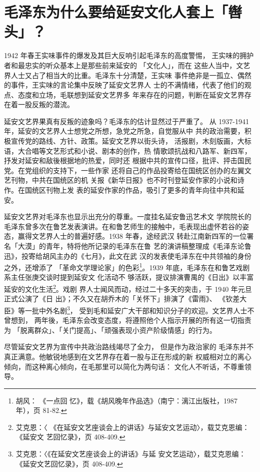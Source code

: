 \section{毛泽东为什么要给延安文化人套上「辔头」？}
1942 年春王实味事件的爆发及其巨大反响引起毛泽东的高度警惕，
王实味的拥护者和最忠实的听众基本上是那些前来延安的
「文化人」，而在
这些人当中，文艺界人士又占了相当大的比重。毛泽东十分清楚，王实味
事件绝非是一孤立、偶然的事件，王实味的言论集中反映了延安文艺界人
士的不满情绪，代表了他们的观点、态度和立场，毛联想到延安文艺界多
年来存在的问题，判断在延安文艺界存在着一股反叛的潜流。

延安文艺界果真有反叛的迹象吗？毛泽东的估计显然过于严重了。
从
1937-1941 年，延安的文艺界人士想党之所想，急党之所急，自觉服从中
共的政治需要，积极宣传党的路线、方针、政策。延安文艺界以街头诗，
活报剧，木刻版画，大标语，大合唱等文艺形式和小说、剧本的创作，热
情歌颂抗战和八路军、新四军，抒发对延安和敌後根据地的热爱，同时还
根据中共的宣传口径，批评、抨击国民党。在党组织的支持下，一些作家
还将自己的作品投寄给在国统区创办的左翼文艺刊物，中共在国统区的机
关报《新华日报》也不时刊登延安作家的小说和诗作。在国统区刊物上发
表的延安作家的作品，吸引了更多的青年向往中共和延安。

延安文艺界对毛泽东也显示出充分的尊重。一度挂名延安鲁迅艺术文 学院院长的
毛泽东曾多次在鲁艺发表演讲。在和鲁艺师生的接触中，毛表现出虚怀若谷的姿
态，赢得文艺界人士的普遍好感。1938 年春，途经武汉 转赴江南新四军的一位署
名「大漠」的青年，特将他所记录的毛泽东在鲁 艺的演讲稿整理成《毛泽东论鲁
迅》，投寄给胡风主办的《七月》，此文在武
汉的发表使毛泽东在中共领袖的身份之外，还增添了 「革命文学理论家」的色彩\footnote{胡风： 《一点回
忆》，载《胡风晚年作品选》（南宁：漓江出版社，1987 年），页
81-82.}。1939 年底，毛泽东在和鲁艺戏剧系主任张庚交谈时提到延安文 化活动不
够活跃，提议排演曹禺的《日出》以丰富延安的文化生活\footnote{艾克恩：〈
《在延安文艺座谈会上的讲话》与延安文艺运动〉，载艾克恩编： 《延安文
艺回忆录》，页 408-409.}。戏剧 界人士闻风而动，经过二十多天的突击，于
1940 年元旦正式公演了《日 出》；不久又在胡乔木的「关怀下」排演了《雷雨》、
《钦差大臣》等一批中外名剧\footnote{艾克恩：〈《在延安文艺座谈会上的讲话》与延
安文艺运动〉，载艾克恩编： 《延安文艺回忆录》，页 408-409.}，
受到毛和延安广大干部和知识分子的欢迎。文艺界人士不曾想到，
两年後，毛泽东会改变态度，将遵照他个人指示开展的所有这一切指责为
「脱离群众」、「关门提高」、「顽强表现小资产阶级情感」的行为。

尽管延安文艺界为宣传中共政治路线竭尽了全力，
但是作为政治家的
毛泽东并不真正满意。他敏锐地感到在文艺界存在着一股与正在形成的新
权威相对立的离心倾向，而这种离心倾向，在毛那里可以简化为两句话：
文化人不听话，不尊重领导。

